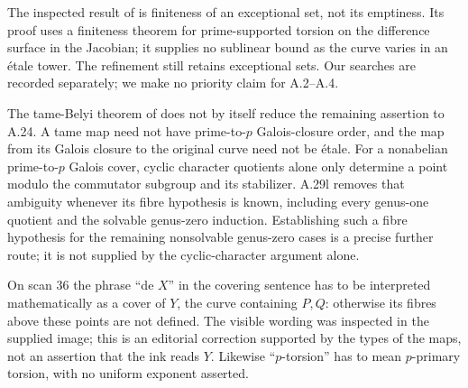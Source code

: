 The inspected result of \citet[Proposition 1.8(vi) and Corollary
1.11(iii)]{A_SaidiTamagawa2009} is finiteness of an exceptional set,
not its emptiness. Its proof uses a finiteness theorem for
prime-supported torsion on the difference surface in the Jacobian;
it supplies no sublinear bound as the curve varies in an \'etale
tower. The refinement \citep{A_SaidiTamagawa2017} still retains
exceptional sets. Our searches are recorded separately; we make
no priority claim for A.2--A.4.

The tame-Belyi theorem of \citet[Theorems 1.2 and
1.5]{A_KedlayaLittWitaszek2023} does not by itself reduce
the remaining assertion to A.24. A tame map need not have
prime-to-$p$ Galois-closure order, and the map from its
Galois closure to the original curve need not be \'etale.
For a nonabelian prime-to-$p$ Galois cover, cyclic
character quotients alone only determine a point modulo
the commutator subgroup and its stabilizer. A.29l removes
that ambiguity whenever its fibre hypothesis is known,
including every genus-one quotient and the solvable
genus-zero induction. Establishing such a fibre
hypothesis for the remaining nonsolvable genus-zero
cases is a precise further route; it is not supplied
by the cyclic-character argument alone.

On scan 36 the phrase ``de $X$'' in the covering sentence has to be
interpreted mathematically as a cover of $Y$, the curve containing
$P,Q$: otherwise its fibres above these points are not defined.
The visible wording was inspected in the supplied image; this is
an editorial correction supported by the types of the maps, not
an assertion that the ink reads $Y$. Likewise ``$p$-torsion'' has
to mean $p$-primary torsion, with no uniform exponent asserted.
